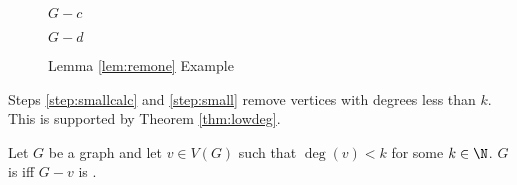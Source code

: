 \begin{figure}[h]
\begin{minipage}{1.25in}
\begin{center}
      \(G-c\)
    \end{center}
  \end{minipage}
  \begin{minipage}{1.25in}
    \begin{center}

      \bigskip

      \(G-d\)
    \end{center}
  \end{minipage}
  \caption{Lemma \ref{lem:remone} Example}
\end{figure}

Steps \ref{step:smallcalc} and \ref{step:small} remove vertices with degrees less than \(k\).  This is supported by
Theorem \ref{thm:lowdeg}.

\begin{theorem}
  \label{thm:lowdeg}
  Let \(G\) be a graph and let \(v\in V(G)\) such that \(\deg(v)<k\) for some \(k\in\N\).  \(G\) is  iff
  \(G-v\) is .
\end{theorem}


